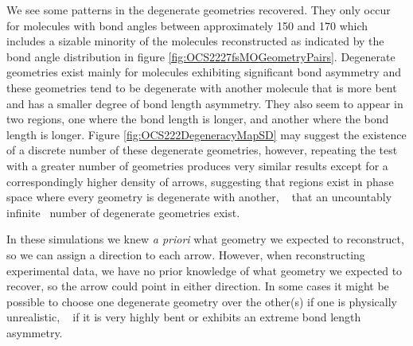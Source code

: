 We see some patterns in the degenerate geometries recovered. They only occur for molecules with bond angles between approximately \SI{150}{\deg} and \SI{170}{\deg} which includes a sizable minority of the molecules reconstructed as indicated by the bond angle distribution in figure \ref{fig:OCS2227fsMOGeometryPairs}. Degenerate geometries exist mainly for molecules exhibiting significant bond asymmetry and these geometries tend to be degenerate with another molecule that is more bent and has a smaller degree of bond length asymmetry. They also seem to appear in two regions, one where the  bond length is longer, and another where the  bond length is longer. Figure \ref{fig:OCS222DegeneracyMapSD} may suggest the existence of a discrete number of these degenerate geometries, however, repeating the test with a greater number of geometries produces very similar results except for a correspondingly higher density of arrows, suggesting that regions exist in phase space where every geometry is degenerate with another, \ie~ that an uncountably infinite\footnotemark~ number of degenerate geometries exist.


In these simulations we knew \textit{a priori} what geometry we expected to reconstruct, so we can assign a direction to each arrow. However, when reconstructing experimental data, we have no prior knowledge of what geometry we expected to recover, so the arrow could point in either direction. In some cases it might be possible to choose one degenerate geometry over the other(s) if one is physically unrealistic, \eg~ if it is very highly bent or exhibits an extreme bond length asymmetry.

